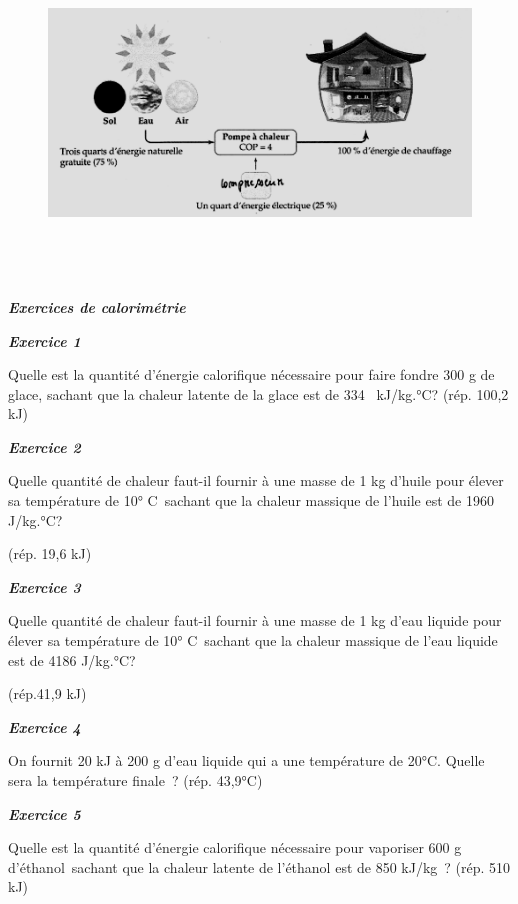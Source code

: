 \begin{figure}
\centering
\includegraphics[width=17.898cm,height=8.819cm]{Pictures/10000001000001E1000000ED8743610641ABBB0F.png}
\caption{}
\end{figure}

\emph{\textbf{Exercices de calorimétrie}}

\emph{\textbf{Exercice 1}}

Quelle est la quantité d'énergie calorifique nécessaire pour faire
fondre 300 g de glace, sachant que la chaleur latente de la glace est de
334~ kJ/kg.°C? (rép. 100,2 kJ)

\emph{\textbf{Exercice 2}}

Quelle quantité de chaleur faut-il fournir à une masse de 1 kg d'huile
pour élever sa température de 10° C~sachant que la chaleur massique de
l'huile est de 1960 J/kg.°C?

(rép. 19,6 kJ)

\emph{\textbf{Exercice 3}}

Quelle quantité de chaleur faut-il fournir à une masse de 1 kg d'eau
liquide pour élever sa température de 10° C~sachant que la chaleur
massique de l'eau liquide est de 4186 J/kg.°C?

(rép.41,9 kJ)

\emph{\textbf{Exercice 4}}

On fournit 20 kJ à 200 g d'eau liquide qui a une température de 20°C.
Quelle sera la température finale~? (rép. 43,9°C)

\emph{\textbf{Exercice 5}}

Quelle est la quantité d'énergie calorifique nécessaire pour vaporiser
600 g d'éthanol~sachant que la chaleur latente de l'éthanol est de 850
kJ/kg~? (rép. 510 kJ)

